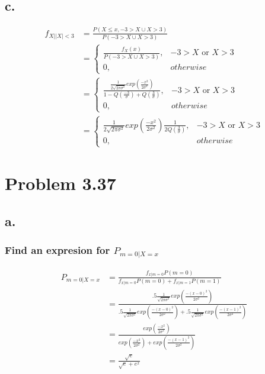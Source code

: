 \documentclass[12pt]{article}
\newcommand{\normD}[3]{\frac{1}{\sqrt{2\pi #1^2}}exp(\frac{-( #2 - #3)^2}{2 #1^2})}
\begin{document}
\subsection*{c.} %
\begin{align*}
  f_{X||X|<3} &= \frac{P(X \leq x, -3>X \cup  X>3)}{P(-3>X \cup  X>3)} \\
  &= \begin{cases} 
    \frac{f_X(x)}{P(-3>X \cup  X>3)}, &  -3>X \textrm{ or } X>3\\
    0, & otherwise 
  \end{cases} \\
  &= \begin{cases} 
    \frac{\frac{1}{2\sqrt{2\pi\sigma^2}}exp(\frac{-x^2}{2\sigma^2})}
    {1- Q(\frac{-3}{\sigma}) + Q(\frac{3}{\sigma})}, & -3>X \textrm{ or } X>3 \\
    0, & otherwise 
  \end{cases} \\
  &= \begin{cases} 
    \frac{1}{2\sqrt{2\pi\sigma^2}}exp(\frac{-x^2}{2\sigma^2})
    \frac{1}{2Q(\frac{3}{\sigma})}, &  -3>X \textrm{ or } X>3 \\
    0, & otherwise 
  \end{cases}
\end{align*}


\section*{Problem 3.37}
\subsection*{a.}
\subsubsection*{Find an expresion for $P_{m=0|X=x}$}
\begin{align*}
  P_{m=0|X=x} &= \frac{f_{x|m=0}P(m=0)}{f_{x|m=0}P(m=0)+f_{x|m=1}P(m=1)} \\
  &= \frac{.5\normD{\sigma}{x}{0}}{.5\normD{\sigma}{x}{0}+.5\normD{\sigma}{x}{1}} \\
  &= \frac{exp(\frac{-x^2}{2\sigma^2})}
    {exp(\frac{-x^2}{2\sigma^2})+exp(\frac{-(x-1)^2}{2\sigma^2})} \\
  &= \frac{\sqrt{e}}{\sqrt{e}+e^x} 
\end{align*}
\end{document}
